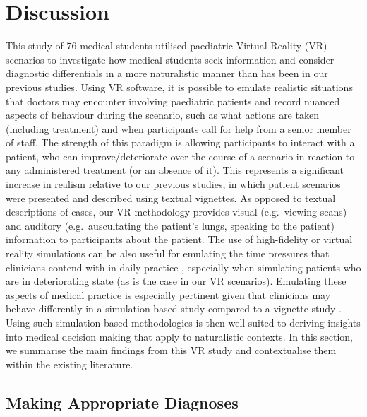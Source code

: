 \documentclass[a4paper, nobind]{templates/ociamthesis}
\begin{document}
\section{Discussion}\label{discussion-3}

This study of 76 medical students utilised paediatric Virtual Reality (VR) scenarios to investigate how medical students seek information and consider diagnostic differentials in a more naturalistic manner than has been in our previous studies. Using VR software, it is possible to emulate realistic situations that doctors may encounter involving paediatric patients and record nuanced aspects of behaviour during the scenario, such as what actions are taken (including treatment) and when participants call for help from a senior member of staff. The strength of this paradigm is allowing participants to interact with a patient, who can improve/deteriorate over the course of a scenario in reaction to any administered treatment (or an absence of it). This represents a significant increase in realism relative to our previous studies, in which patient scenarios were presented and described using textual vignettes. As opposed to textual descriptions of cases, our VR methodology provides visual (e.g.~viewing scans) and auditory (e.g.~auscultating the patient's lungs, speaking to the patient) information to participants about the patient. The use of high-fidelity or virtual reality simulations can be also useful for emulating the time pressures \autocite{schmidt_simulation_2013,jans_examining_2023} that clinicians contend with in daily practice \autocite{yates_physician_2020}, especially when simulating patients who are in deteriorating state (as is the case in our VR scenarios). Emulating these aspects of medical practice is especially pertinent given that clinicians may behave differently in a simulation-based study compared to a vignette study \autocite{yang_effect_2012}. Using such simulation-based methodologies is then well-suited to deriving insights into medical decision making that apply to naturalistic contexts. In this section, we summarise the main findings from this VR study and contextualise them within the existing literature.

\subsection{Making Appropriate Diagnoses}\label{making-appropriate-diagnoses}
\end{document}
